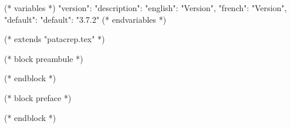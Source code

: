 %
%
%

(* variables *)
{
"version":{ "description": {"english": "Version", "french": "Version"},
            "default": {"default": "3.7.2"}
         }
}
(* endvariables *)

(* extends "patacrep.tex" *)

(* block preambule *)
\usepackage{licence}
(* endblock *)

(* block preface *)
\newpage

\newpage
(* endblock *)
